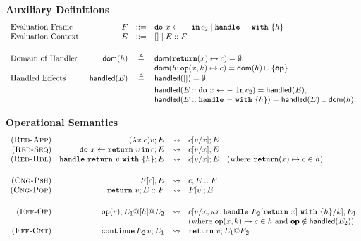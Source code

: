 \begin{figure}[ht]
  \arraycolsep=3pt
\begin{eff-desc}
  
  \renewcommand{\effconfiguration}[2]{{#1}; {#2}}
  \renewcommand{\transition}[2]{#1 & \leadsto & #2}
  \newcommand{\rulename}[2]{(\textsc{{#1}-{#2}})}
  \newcommand{\reductionRule}[1]{\rulename{Red}{#1}}
  \newcommand{\congruenceRule}[1]{\rulename{Cng}{#1}}
  \newcommand{\effectRule}[1]{\rulename{Eff}{#1}}
  \footnotesize
  \textbf{Auxiliary Definitions}
  {\scriptsize
    \[\begin{array}{lrcl}
    \text{Evaluation Frame } & F & ::= & \bind{x}{-\,}{c_2} \mid \handleWith{-}{h} \\
    \text{Evaluation Context } & E & ::= & [] \mid E::F \\ \vspace{1mm} \\
    \text{Domain of Handler} & \textsf{dom}(h) & \triangleq & \textsf{dom}(\returnHandler{x}{c}) = \emptyset, \\
    &&&\textsf{dom}(h;\opHandler{x}{k}{c}) = \textsf{dom}(h) \cup \{ \textbf{\textsf{op}} \} \\  
    \vspace{1mm} \text{Handled Effects} & \textsf{handled}(E) & \triangleq & \textsf{handled}([]) = \emptyset, \\ 
    &&& \textsf{handled}(E::\bind{x}{-\,}{c_2}) = \textsf{handled}(E), \\
    &&& \textsf{handled}(E::\handleWith{-}{h}) = \textsf{handled}(E) \cup \textsf{dom}(h),
  \end{array}
  \]}

\noindent\textbf{Operational Semantics}
  {\scriptsize
\[
  \begin{array}{rrcl}
  \reductionRule{App} & \transition{\effconfiguration{(\function{x}{c})v}{E}}{\effconfiguration{c[v/x]}{E}}\\
  \reductionRule{Seq} & \transition{\effconfiguration{\bind{x}{\return{v}}{c}}{E}}{\effconfiguration{c[v/x]}{E}}\\
  \reductionRule{Hdl} & \transition{\effconfiguration{\handleWith{\return{v}}{h}}{E}}{\effconfiguration{c[v/x]}{E}} \quad (\text{where $\returnHandler{x}{c} \in h$)}\\
  \vspace{1mm} \\ 
  \congruenceRule{Psh} & \transition{\effconfiguration{F[c]}{E}}{\effconfiguration{c}{E::F}} \\
  \congruenceRule{Pop} & \transition{\effconfiguration{\return{v}}{E::F}}{\effconfiguration{F[v]}{E}}\\
  \vspace{1mm} \\
  \effectRule{Op} & \transition{\effconfiguration{\op{v}}{E_1 @ [h] @ E_2}}\effconfiguration{c[v/x, \kappa x. \, \handleWith{E_2[\return{x}]}{h} / k]}{E_1}\\
  &&& \text{(where $\opHandler{x}{k}{c} \in h$ and $\textbf{\textsf{op}} \notin \textsf{handled}(E_2)$)}\\
  \effectRule{Cnt} & \transition{\effconfiguration{\continue{E_2}{v}}{E_1}}{\effconfiguration{\return{v}}{E_1 @ E_2}}


\end{array}\]}
\end{eff-desc}
\end{figure}
